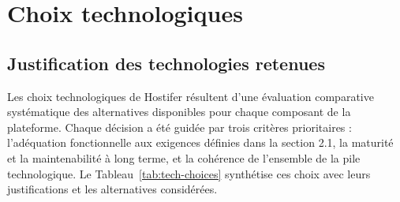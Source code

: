 
\section{Choix technologiques}

\subsection{Justification des technologies retenues}

Les choix technologiques de Hostifer résultent d'une évaluation comparative systématique des alternatives disponibles pour chaque composant de la plateforme. Chaque décision a été guidée par trois critères prioritaires : l'adéquation fonctionnelle aux exigences définies dans la section 2.1, la maturité et la maintenabilité à long terme, et la cohérence de l'ensemble de la pile technologique. Le Tableau~\ref{tab:tech-choices} synthétise ces choix avec leurs justifications et les alternatives considérées.

